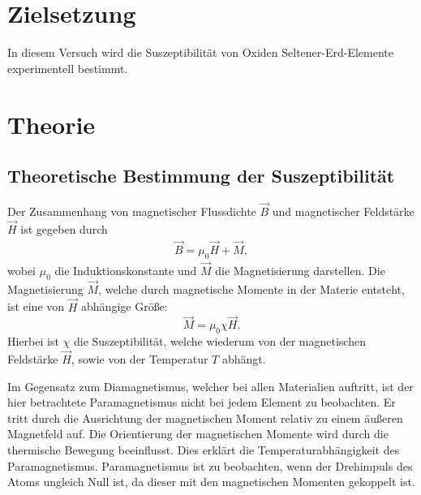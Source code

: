 \section{Zielsetzung}
\label{sec:Zielsetzung}
In diesem Versuch wird die Suszeptibilität von Oxiden Seltener-Erd-Elemente experimentell bestimmt.

\section{Theorie}
\label{sec:Theorie}
\subsection{Theoretische Bestimmung der Suszeptibilität}
Der Zusammenhang von magnetischer Flussdichte $\vec{B}$ und magnetischer Feldstärke $\vec{H}$ ist gegeben durch
\begin{align*}
\vec{B} = \mu_0 \vec{H} + \vec{M},
\end{align*}
wobei $\mu_0$ die Induktionskonstante und $\vec{M}$ die Magnetisierung darstellen. Die
Magnetisierung $\vec{M}$, welche durch magnetische Momente in der Materie entsteht, ist eine von
$\vec{H}$ abhängige Größe:
\begin{equation}
\label{m}
\vec{M} = \mu_0 \chi \vec{H}.
\end{equation}
Hierbei ist $\chi$ die Suszeptibilität, welche wiederum von der magnetischen Feldstärke $\vec{H}$,
sowie von der Temperatur $T$ abhängt.

\noindent Im Gegensatz zum Diamagnetismus, welcher bei allen Materialien auftritt, ist der hier
betrachtete Paramagnetismus nicht bei jedem Element zu beobachten. Er tritt durch die Ausrichtung der 
magnetischen Moment relativ zu einem äußeren Magnetfeld auf. Die
Orientierung der magnetischen Momente wird durch die thermische Bewegung beeinflusst. Dies erklärt
die Temperaturabhängigkeit des Paramagnetismus. Paramagnetismus ist zu beobachten, wenn der
Drehimpuls des Atoms ungleich Null ist, da dieser mit den magnetischen Momenten gekoppelt ist.

